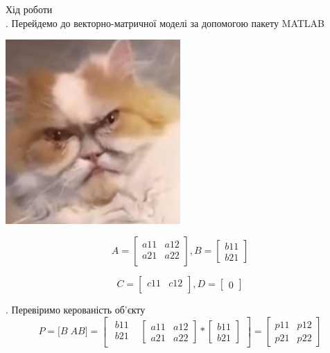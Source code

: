 \documentclass[a4paper]{article}
\begin{document}
Хід роботи\\

\hfill \break
{}. Перейдемо до векторно-матричної моделі за допомогою пакету
MATLAB\\

\begin{center}
\includegraphics[width=0.5\textwidth]{functionInit}
\end{center}

\[
A =
\begin{bmatrix}
    {{a11}} & {{a12}} \\
    {{a21}} & {{a22}} \\
\end{bmatrix},
B =
\begin{bmatrix}
    {{b11}} \\ {{b21}}
\end{bmatrix}
\]

\[
C =
\begin{bmatrix}
    {{c11}} & {{c12}} \\
\end{bmatrix},
D =
\begin{bmatrix}
    0
\end{bmatrix}
\]

\hfill \break
{}. Перевіримо керованість об’єкту\\

\[
P = \big[ B \; AB \big] = 
\left[ 
  \begin{array}{cc}

\begin{matrix}
{{b11}} \\
{{b21}} \\
\end{matrix}
 & \begin{bmatrix}
{{a11}} & {{a12}} \\
{{a21}} & {{a22}}
\end{bmatrix} * 
\begin{bmatrix}
{{b11}} \\ {{b21}}
\end{bmatrix}
\end{array}\right]
=
\begin{bmatrix}
{{p11}} & {{p12}} \\
{{p21}} & {{p22}}
\end{bmatrix}
\]
\end{document}
